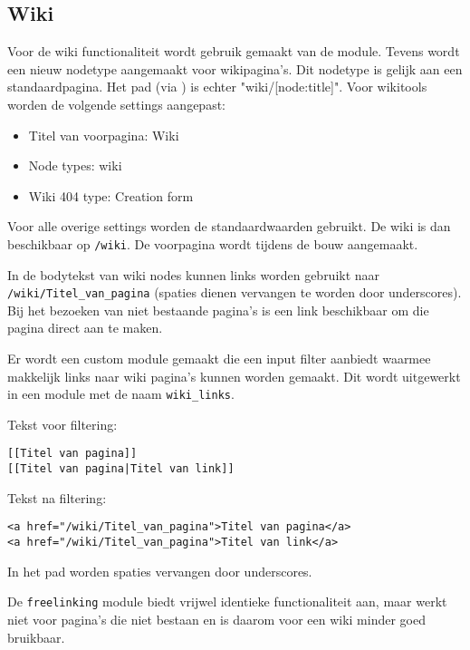 \subsection{Wiki}\label{wiki}

Voor de wiki functionaliteit wordt gebruik gemaakt van de  module. Tevens wordt een nieuw nodetype aangemaakt voor wikipagina's. Dit nodetype is gelijk aan een standaardpagina. Het pad (via ) is echter "wiki/[node:title]". Voor wikitools worden de volgende settings aangepast:
\begin{itemize}
\item Titel van voorpagina: Wiki
\item Node types: wiki
\item Wiki 404 type: Creation form
\end{itemize}
Voor alle overige settings worden de standaardwaarden gebruikt. De wiki is dan beschikbaar op \texttt{/wiki}. De voorpagina wordt tijdens de bouw aangemaakt.

In de bodytekst van wiki nodes kunnen links worden gebruikt naar \texttt{/wiki/Titel\_van\_pagina} (spaties dienen vervangen te worden door underscores). Bij het bezoeken van niet bestaande pagina's is een link beschikbaar om die pagina direct aan te maken.

Er wordt een custom module gemaakt die een input filter aanbiedt waarmee makkelijk links naar wiki pagina's kunnen worden gemaakt. Dit wordt uitgewerkt in een module met de naam \texttt{wiki\_links}.

Tekst voor filtering:
\begin{verbatim}
[[Titel van pagina]]
[[Titel van pagina|Titel van link]]
\end{verbatim}
Tekst na filtering:
\begin{verbatim}
<a href="/wiki/Titel_van_pagina">Titel van pagina</a>
<a href="/wiki/Titel_van_pagina">Titel van link</a>
\end{verbatim}
In het pad worden spaties vervangen door underscores.

De \texttt{freelinking} module biedt vrijwel identieke functionaliteit aan, maar werkt niet voor pagina's die niet bestaan en is daarom voor een wiki minder goed bruikbaar.

